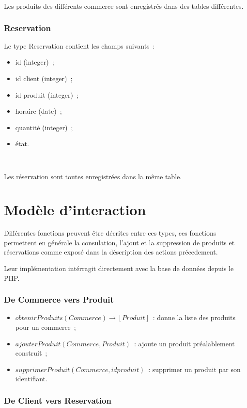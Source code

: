 \documentclass[a4paper,12pt]{article}
\begin{document}
Les produits des différents commerce sont enregistrés dans des tables différentes.

\subsubsection{Reservation}

Le type Reservation contient les champs suivants~:
\begin{itemize}
	\item id (integer)~;
	\item id client (integer)~;
	\item id produit (integer)~;
	\item horaire (date)~;
	\item quantité (integer)~;
	\item état.
\end{itemize} \

Les réservation sont toutes enregistrées dans la même table.

\section{Modèle d'interaction}

Différentes fonctions peuvent être décrites entre ces types, ces fonctions permettent en générale la consulation, l'ajout et la suppression de produits et réservations comme exposé dans la déscription des actions précedement.

Leur implémentation intérragit directement avec la base de données depuis le PHP.

\subsubsection{De Commerce vers Produit}

\begin{itemize}
	\item $obtenirProduits(Commerce) \rightarrow [Produit]$~: donne la liste des produits pour un commerce~;
	\item $ajouterProduit(Commerce, Produit)$~: ajoute un produit préalablement construit~;
	\item $supprimerProduit(Commerce, idproduit)$~: supprimer un produit par son identifiant.
\end{itemize}

\subsubsection{De Client vers Reservation}
\end{document}
